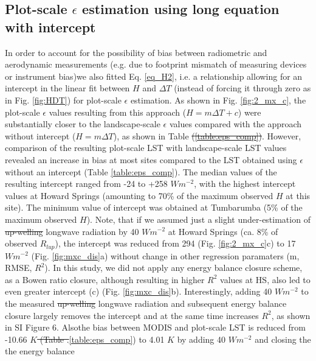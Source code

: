 \documentclass[fleqn,10pt]{wlscirep}
\providecommand{\DIFaddtex}[1]{{\protect\color{blue}\uwave{#1}}} %
\providecommand{\DIFdeltex}[1]{{\protect\color{red}\sout{#1}}}                      %
\providecommand{\DIFaddbegin}{} %
\providecommand{\DIFaddend}{} %
\providecommand{\DIFdelbegin}{} %
\providecommand{\DIFdelend}{} %
\providecommand{\DIFadd}[1]{\texorpdfstring{\DIFaddtex{#1}}{#1}} %
\providecommand{\DIFdel}[1]{\texorpdfstring{\DIFdeltex{#1}}{}} %
\begin{document}
\subsection{Plot-scale $\epsilon$ estimation using long equation with intercept}
In order to account for the possibility of bias between radiometric and aerodynamic measurements (e.g. due to footprint mismatch of measuring devices or instrument bias)\DIFaddbegin \DIFadd{, }\DIFaddend we also fitted Eq. \ref{eq_H2}, i.e. a relationship allowing for an intercept in the linear fit between $H$ and $\Delta T$ (instead of forcing it through zero as in Fig. \ref{fig:HDT}) for plot-scale $\epsilon$ estimation. As shown in Fig. \ref{fig:2_mx_c}, the plot-scale $\epsilon$ values resulting from this approach ($H=m \Delta T + c$) were substantially closer to the landscape-scale $\epsilon$ values compared with the approach without intercept ($H=m \Delta T$), as shown in Table \DIFdelbegin \DIFdel{(\ref{table:eps_comp})}\DIFdelend \DIFaddbegin \DIFadd{\ref{table:eps_comp}}\DIFaddend . However, comparison of the resulting plot-scale LST with landscape-scale LST values revealed an increase in bias at most sites compared to the LST obtained using \DIFdelbegin \DIFdel{$\epsilon$ }\DIFdelend \DIFaddbegin \DIFadd{$\epsilon_{plot}$ }\DIFaddend without an intercept (Table \ref{table:eps_comp}). The median values of the resulting intercept ranged from -24 to +258 $Wm^{-2}$, with the highest intercept values at Howard Springs (amounting to 70\% of the maximum observed $H$ at this site). The minimum value of intercept was obtained at Tumbarumba (5\% of the maximum observed $H$). Note, that if we assumed just a slight under-estimation of \DIFdelbegin \DIFdel{up-welling }\DIFdelend \DIFaddbegin \DIFadd{upwelling }\DIFaddend longwave radiation by 40 $Wm^{-2}$ at Howard Springs (ca. 8\% of observed $R_{lup}$), the intercept was reduced from 294 (Fig. \ref{fig:2_mx_c}c) to 17 $Wm^{-2}$ (Fig. \ref{fig:mxc_dis}a) without change in other regression paramaters (m, RMSE, $R^{2}$). In this study, we did not apply any energy balance closure scheme, as a Bowen ratio closure, although resulting in higher $R^{2}$ values at HS, also led to even greater intercept (c) (Fig. \ref{fig:mxc_dis}b). Interestingly, adding 40 $Wm^{-2}$ to the  measured \DIFdelbegin \DIFdel{up-welling }\DIFdelend \DIFaddbegin \DIFadd{upwelling }\DIFaddend longwave radiation and subsequent energy balance closure largely removes the intercept and at the same time increases $R^2$, as shown in SI Figure 6. Also\DIFaddbegin \DIFadd{, }\DIFaddend the bias between MODIS and plot-scale LST is reduced from -10.66 \DIFdelbegin \DIFdel{$K$ (Table .}\DIFdelend \DIFaddbegin \DIFadd{K (Table }\DIFaddend \ref{table:eps_comp}) to 4.01 $K$ by adding 40 $Wm^{-2}$ and closing the the energy balance\DIFaddbegin \DIFadd{. 
}\DIFaddend 
\end{document}

